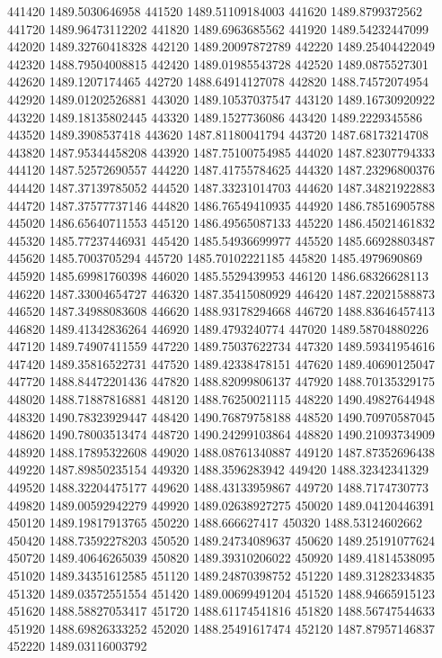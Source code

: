 {441420 1489.5030646958
441520 1489.51109184003
441620 1489.8799372562
441720 1489.96473112202
441820 1489.6963685562
441920 1489.54232447099
442020 1489.32760418328
442120 1489.20097872789
442220 1489.25404422049
442320 1488.79504008815
442420 1489.01985543728
442520 1489.0875527301
442620 1489.1207174465
442720 1488.64914127078
442820 1488.74572074954
442920 1489.01202526881
443020 1489.10537037547
443120 1489.16730920922
443220 1489.18135802445
443320 1489.1527736086
443420 1489.2229345586
443520 1489.3908537418
443620 1487.81180041794
443720 1487.68173214708
443820 1487.95344458208
443920 1487.75100754985
444020 1487.82307794333
444120 1487.52572690557
444220 1487.41755784625
444320 1487.23296800376
444420 1487.37139785052
444520 1487.33231014703
444620 1487.34821922883
444720 1487.37577737146
444820 1486.76549410935
444920 1486.78516905788
445020 1486.65640711553
445120 1486.49565087133
445220 1486.45021461832
445320 1485.77237446931
445420 1485.54936699977
445520 1485.66928803487
445620 1485.7003705294
445720 1485.70102221185
445820 1485.4979690869
445920 1485.69981760398
446020 1485.5529439953
446120 1486.68326628113
446220 1487.33004654727
446320 1487.35415080929
446420 1487.22021588873
446520 1487.34988083608
446620 1488.93178294668
446720 1488.83646457413
446820 1489.41342836264
446920 1489.4793240774
447020 1489.58704880226
447120 1489.74907411559
447220 1489.75037622734
447320 1489.59341954616
447420 1489.35816522731
447520 1489.42338478151
447620 1489.40690125047
447720 1488.84472201436
447820 1488.82099806137
447920 1488.70135329175
448020 1488.71887816881
448120 1488.76250021115
448220 1490.49827644948
448320 1490.78323929447
448420 1490.76879758188
448520 1490.70970587045
448620 1490.78003513474
448720 1490.24299103864
448820 1490.21093734909
448920 1488.17895322608
449020 1488.08761340887
449120 1487.87352696438
449220 1487.89850235154
449320 1488.3596283942
449420 1488.32342341329
449520 1488.32204475177
449620 1488.43133959867
449720 1488.7174730773
449820 1489.00592942279
449920 1489.02638927275
450020 1489.04120446391
450120 1489.19817913765
450220 1488.666627417
450320 1488.53124602662
450420 1488.73592278203
450520 1489.24734089637
450620 1489.25191077624
450720 1489.40646265039
450820 1489.39310206022
450920 1489.41814538095
451020 1489.34351612585
451120 1489.24870398752
451220 1489.31282334835
451320 1489.03572551554
451420 1489.00699491204
451520 1488.94665915123
451620 1488.58827053417
451720 1488.61174541816
451820 1488.56747544633
451920 1488.69826333252
452020 1488.25491617474
452120 1487.87957146837
452220 1489.03116003792
}
